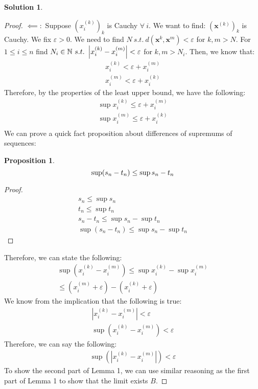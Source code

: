 \documentclass[12pt]{article}
\theoremstyle{definition} %
\newtheorem{solution}{Solution}
\newtheorem*{proposition}{Proposition}
\theoremstyle{plain} %
\begin{document}
\begin{solution}
\begin{proof}
        $\impliedby :$ Suppose $(x_{i}^{(k)})_{k}$ is Cauchy $\forall \ i$. We want to find: $(\mathbf{x}^{(k)})_{k}$ is Cauchy. We fix $\varepsilon >0$. We need to find $N\ s.t. \ d(\mathbf{x}^{k}, \mathbf{x}^{m})<\varepsilon $ for $k, m>N$. For $1\leq i\leq n$ find $N_{i} \in \mathbb{\MakeUppercase{n}} \ s.t. \ \left\vert x_{i}^{(k)}- x_{i}^{(m)} \right\vert < \varepsilon$ for $k,m>N_{i} $. Then, we know that:
        \begin{align}
            x_{i}^{(k)} <\varepsilon + x_{i}^{(m)} \\[10pt] 
            x_{i}^{(m)} < \varepsilon + x_{i}^{(k)} 
        \end{align}
        Therefore, by the properties of the least upper bound, we have the following:
        \begin{align}
          \sup x_{i}^{(k)} \leq \varepsilon + x_{i}^{(m)}\\[10pt] 
          \sup x_{i}^{(m)} \leq \varepsilon + x_{i}^{(k)}\\[10pt] 
        \end{align}
        We can prove a quick fact proposition about differences of supremums of sequences:
        \begin{proposition}
       \[ 
          \sup (s_{n} -t_{n} )\leq \sup s_{n} - t_{n} \\[10pt]  
       \] 
        \end{proposition}
        \begin{proof}
            \begin{align}
                s_{n} \leq \sup s_{n} \\[10pt] 
                t_{n} \leq \sup t_{n} \\[10pt] 
                s_{n} - t_{n} \leq \sup s_{n} -\sup t_{n} \\[10pt] 
                \sup (s_{n} -t_{n} ) \leq \sup s_{n} -\sup t_{n} 
            \end{align}
        \end{proof}
        Therefore, we can state the following:
        \begin{align}
            \sup (x_{i}^{(k)} -x_{i}^{(m)})\leq \sup x_{i}^{(k)}-\sup x_{i}^{(m)}\\[10pt] 
            \leq (x_{i}^{(m)} +\varepsilon )-(x_{i}^{(k)} +\varepsilon )
        \end{align}
        We know from the implication that the following is true:
        \begin{align} 
            \left\vert x_{i}^{(k)}- x_{i}^{(m)} \right\vert< \varepsilon \\[10pt] 
            \sup (x_{i}^{(k)}-x_{i}^{(m)}    )<\varepsilon 
        \end{align}
        Therefore, we can say the following:
        \begin{align} 
            \sup \left(  \left\vert x_{i}^{(k)}-x_{i}^{(m)} \right\vert\right)      <\varepsilon 
        \end{align}
        To show the second part of Lemma 1, we can use similar reasoning as the first part of Lemma 1 to show that the limit exists $B$.  
    \end{proof}
\end{solution}
\end{document}
